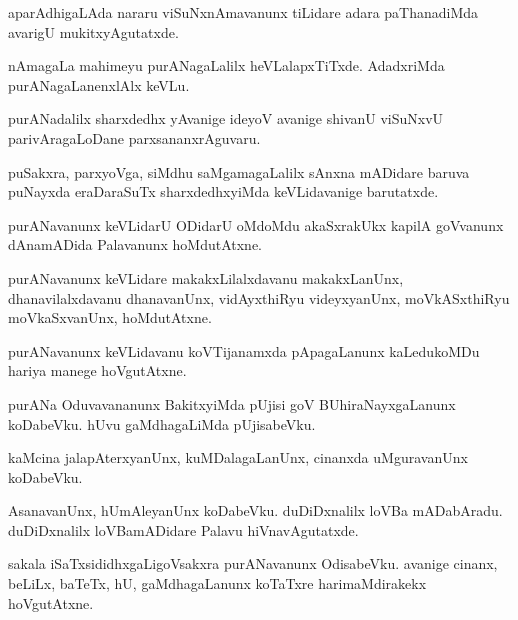 \begin{mng}
aparAdhigaLAda nararu viSuNxnAmavanunx tiLidare adara paThanadiMda avarigU mukitxyAgutatxde.
\end{mng}

\begin{mng}
nAmagaLa mahimeyu purANagaLalilx heVLalapxTiTxde. AdadxriMda purANagaLanenxlAlx keVLu.
\end{mng}

\begin{mng}
purANadalilx sharxdedhx yAvanige ideyoV avanige shivanU viSuNxvU parivAragaLoDane parxsananxrAguvaru.
\end{mng}

\begin{mng}
puSakxra, parxyoVga, siMdhu saMgamagaLalilx sAnxna mADidare baruva puNayxda eraDaraSuTx sharxdedhxyiMda keVLidavanige barutatxde.
\end{mng}

\begin{mng}
purANavanunx keVLidarU ODidarU oMdoMdu akaSxrakUkx kapilA goVvanunx dAnamADida Palavanunx hoMdutAtxne.
\end{mng}

\begin{mng}
purANavanunx keVLidare makakxLilalxdavanu makakxLanUnx, dhanavilalxdavanu dhanavanUnx, vidAyxthiRyu videyxyanUnx, moVkASxthiRyu moVkaSxvanUnx, hoMdutAtxne.
\end{mng}

\begin{mng}
purANavanunx keVLidavanu koVTijanamxda pApagaLanunx kaLedukoMDu hariya manege hoVgutAtxne.
\end{mng}

\begin{mng}
purANa Oduvavananunx BakitxyiMda pUjisi goV BUhiraNayxgaLanunx koDabeVku. hUvu gaMdhagaLiMda pUjisabeVku.
\end{mng}

\begin{mng}
kaMcina jalapAterxyanUnx, kuMDalagaLanUnx, cinanxda uMguravanUnx koDabeVku.
\end{mng}

\begin{mng}
AsanavanUnx, hUmAleyanUnx koDabeVku. duDiDxnalilx loVBa mADabAradu. duDiDxnalilx loVBamADidare Palavu hiVnavAgutatxde.
\end{mng}

\begin{mng}
sakala iSaTxsididhxgaLigoVsakxra purANavanunx OdisabeVku. avanige cinanx, beLiLx, baTeTx, hU, gaMdhagaLanunx koTaTxre harimaMdirakekx hoVgutAtxne.
\end{mng}

